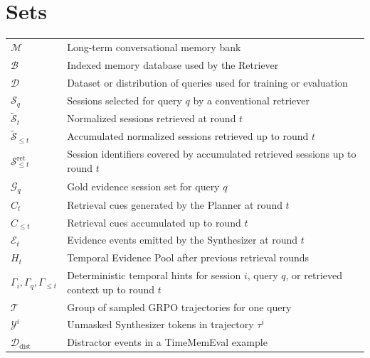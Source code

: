 \section*{Sets}
\renewcommand*{\arraystretch}{1.35}
\begin{longtable}{p{}p{}}
$\mathcal{M}$ & Long-term conversational memory bank\\
$\mathcal{B}$ & Indexed memory database used by the Retriever\\
$\mathcal{D}$ & Dataset or distribution of queries used for training or evaluation\\
$\mathcal{S}_q$ & Sessions selected for query $q$ by a conventional retriever\\
$\widetilde{\mathcal{S}}_t$ & Normalized sessions retrieved at round $t$\\
$\widetilde{\mathcal{S}}_{\le t}$ & Accumulated normalized sessions retrieved up to round $t$\\
$\mathcal{S}^{\mathrm{ret}}_{\le t}$ & Session identifiers covered by accumulated retrieved sessions up to round $t$\\
$\mathcal{G}_q$ & Gold evidence session set for query $q$\\
$C_t$ & Retrieval cues generated by the Planner at round $t$\\
$C_{\le t}$ & Retrieval cues accumulated up to round $t$\\
$\mathcal{E}_t$ & Evidence events emitted by the Synthesizer at round $t$\\
$H_t$ & Temporal Evidence Pool after previous retrieval rounds\\
$\Gamma_i,\Gamma_q,\Gamma_{\le t}$ & Deterministic temporal hints for session $i$, query $q$, or retrieved context up to round $t$\\
$\mathcal{T}$ & Group of sampled GRPO trajectories for one query\\
$\mathcal{Y}^i$ & Unmasked Synthesizer tokens in trajectory $\tau^i$\\
$\mathcal{D}_{\mathrm{dist}}$ & Distractor events in a TimeMemEval example\\
\end{longtable}


